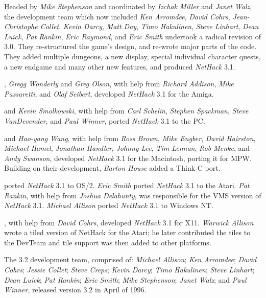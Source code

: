 \medskip
\nd Headed by {\it Mike Stephenson\/} and coordinated by {\it Izchak Miller\/} and
{\it Janet Walz}, the development team which now included {\it Ken Arromdee},
{\it David Cohrs}, {\it Jean-Christophe Collet}, {\it Kevin Darcy},
{\it Matt Day}, {\it Timo Hakulinen}, {\it Steve Linhart}, {\it Dean Luick},
{\it Pat Rankin}, {\it Eric Raymond}, and {\it Eric Smith\/} undertook a radical
revision of 3.0.  They re-structured the game's design, and re-wrote major
parts of the code.  They added multiple dungeons, a new display, special
individual character quests, a new endgame and many other new features, and
produced {\it NetHack\/} 3.1.

\medskip
{}, {\it Gregg Wonderly\/} and {\it Greg Olson}, with help
from {\it Richard Addison}, {\it Mike Passaretti}, and {\it Olaf Seibert},
developed {\it NetHack\/} 3.1 for the Amiga.

\medskip
{} and {\it Kevin Smolkowski}, with help from
{\it Carl Schelin}, {\it Stephen Spackman}, {\it Steve VanDevender},
and {\it Paul Winner}, ported {\it NetHack\/} 3.1 to the PC.

\medskip
{} and {\it Hao-yang Wang},
with help from {\it Ross Brown}, {\it Mike Engber}, {\it David Hairston},
{\it Michael Hamel}, {\it Jonathan Handler}, {\it Johnny Lee},
{\it Tim Lennan}, {\it Rob Menke}, and {\it Andy Swanson},
developed {\it NetHack\/} 3.1 for the Macintosh, porting it for MPW.
Building on their development, {\it Barton House} added a Think C port.

\medskip
{} ported {\it NetHack\/} 3.1 to OS/2.
{\it Eric Smith\/} ported {\it NetHack\/} 3.1 to the Atari.
{\it Pat Rankin}, with help from {\it Joshua Delahunty},
was responsible for the VMS version of {\it NetHack\/} 3.1.
{\it Michael Allison} ported {\it NetHack\/} 3.1 to Windows NT.

\medskip
{}, with help from {\it David Cohrs}, developed {\it NetHack\/}
3.1 for X11.
{\it Warwick Allison} wrote a tiled version of NetHack for the Atari;
he later contributed the tiles to the DevTeam and tile support was
then added to other platforms.

\medskip
\nd The 3.2 development team, comprised of: {\it Michael Allison}; {\it Ken
Arromdee}; {\it David Cohrs}; {\it Jessie Collet}; {\it Steve Creps}; {\it
Kevin Darcy}; {\it Timo Hakulinen}; {\it Steve Linhart}; {\it Dean Luick};
{\it Pat Rankin}; {\it Eric Smith}; {\it Mike Stephenson}; {\it Janet Walz};
and {\it Paul Winner}, released version 3.2 in April of 1996.


